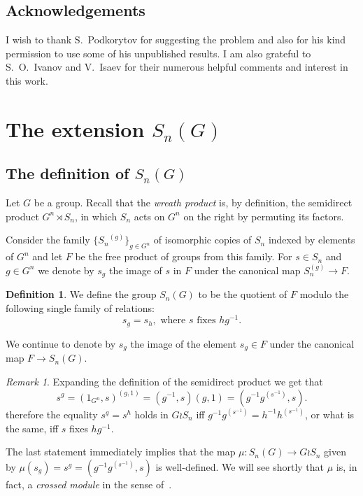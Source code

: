 \documentclass[oneside, 12pt]{amsart}
\theoremstyle{plain}
\numberwithin{equation}{section}
\numberwithin{lemma}{section}
\theoremstyle{remark}
\newtheorem{rem}[lemma]{Remark}
\theoremstyle{definition}
\newtheorem{df}[lemma]{Definition} \Crefname{df}{Definition}{Definitions}
\begin{document}
\subsection{Acknowledgements}
I wish to thank S.~Podkorytov for suggesting the problem and also for his kind permission to use some of his unpublished results.
I am also grateful to S.~O.~Ivanov and V.~Isaev for their numerous helpful comments and interest in this work.

\section{The extension $S_n(G)$} 
\subsection{The definition of $S_n(G)$} \label{sec:QnG-def}
Let $G$ be a group. Recall that the {\it wreath product} is, by definition,
 the semidirect product $G^n \rtimes S_n$, in which $S_n$ acts on $G^n$ on the right by permuting its factors.

Consider the family $\{{S_n}^{(g)}\}_{g\in G^n}$ of isomorphic copies of $S_n$ indexed by elements of $G^n$ and let $F$ be the free product of groups from this family.
For $s\in S_n$ and $g\in G^n$ we denote by 
$s_{g}$ the image of $s$ in $F$ under the canonical map $S_n^{(g)} \to F$.

\begin{df} We define the group $S_n(G)$ to be the quotient of $F$ modulo the following single family of relations:
\begin{equation} \label{eq:main_rel} s_g = s_h, \text{ where $s$ fixes $h g^{-1}$.} \end{equation} \end{df}

We continue to denote by $s_g$ the image of the element $s_g\in F$ under the canonical map $F\to S_n(G)$.

\begin{rem}
Expanding the definition of the semidirect product we get that
\begin{equation} \nonumber s^g = (1_{G^n}, s)^{(g, 1)} = (g^{-1}, s) (g, 1) = (g^{-1} g^{(s^{-1})}, s). \end{equation}
therefore the equality $s^g = s^h$ holds in $G \wr S_n$ iff
$g^{-1} g^{(s^{-1})} = h^{-1} h^{(s^{-1})}$, or what is the same, iff $s$ fixes $hg^{-1}$.

The last statement immediately implies that the map $\mu \colon S_n(G) \to G \wr S_n$ given by $\mu(s_g) = s^g = (g^{-1}g^{(s^{-1})}, s)$
is well-defined. We will see shortly that $\mu$ is, in fact, a {\it crossed module} in the sense of~\cite[\S~2.2]{BHS11}.
\end{rem}
\end{document}
